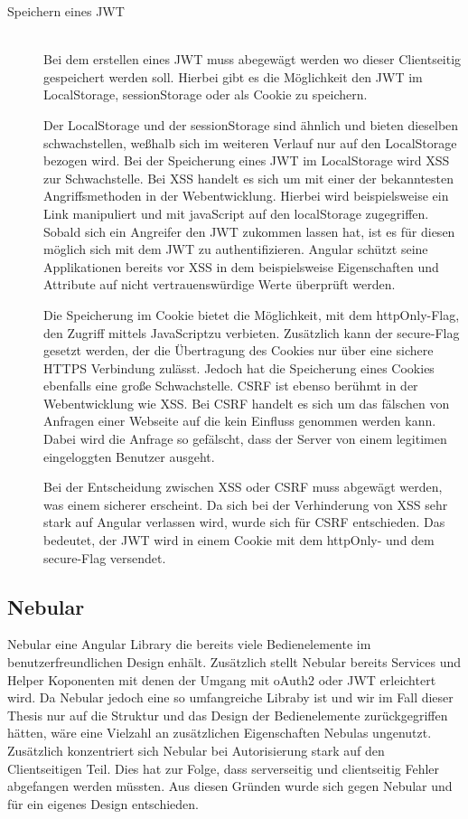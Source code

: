 \documentclass[paper=a4,fontsize=12pt,parskip=half]{scrartcl}
\newcommand{\JS}{JavaScript}
\begin{document}
	\begin{description}
		\item[Speichern eines \gls{JWT}]\hfill\\
		Bei dem erstellen eines \gls{JWT} muss abegewägt werden wo dieser Clientseitig gespeichert werden soll. Hierbei gibt es die Möglichkeit den \gls{JWT} im LocalStorage, sessionStorage oder als Cookie zu speichern.
		
		Der LocalStorage und der sessionStorage sind ähnlich und bieten dieselben schwachstellen, weßhalb sich im weiteren Verlauf nur auf den LocalStorage bezogen wird. Bei der Speicherung eines \gls{JWT} im LocalStorage wird \gls{XSS} zur Schwachstelle. Bei \gls{XSS} handelt es sich um mit einer der bekanntesten Angriffsmethoden in der Webentwicklung. Hierbei wird beispielsweise ein Link manipuliert und mit javaScript auf den localStorage zugegriffen. Sobald sich ein Angreifer den \gls{JWT} zukommen lassen hat, ist es für diesen möglich sich mit dem \gls{JWT} zu authentifizieren. Angular schützt seine Applikationen bereits vor \gls{XSS} in dem beispielsweise Eigenschaften und Attribute auf nicht vertrauenswürdige Werte überprüft werden.
		
		Die Speicherung im Cookie bietet die Möglichkeit, mit dem httpOnly-Flag, den Zugriff mittels \JS  zu verbieten. Zusätzlich kann der secure-Flag gesetzt werden, der die Übertragung des Cookies nur über eine sichere \gls{HTTPS} Verbindung zulässt. Jedoch hat die Speicherung eines Cookies ebenfalls eine große Schwachstelle. \gls{CSRF} ist ebenso berühmt in der Webentwicklung wie \gls{XSS}. Bei \gls{CSRF} handelt es sich um das fälschen von Anfragen einer Webseite auf die kein Einfluss genommen werden kann. Dabei wird die Anfrage so gefälscht, dass der Server von einem legitimen eingeloggten Benutzer ausgeht.
		
		Bei der Entscheidung zwischen \gls{XSS} oder \gls{CSRF} muss abgewägt werden, was einem sicherer erscheint. Da sich bei der Verhinderung von \gls{XSS} sehr stark auf Angular verlassen wird, wurde sich für \gls{CSRF} entschieden. Das bedeutet, der \gls{JWT} wird in einem Cookie mit dem httpOnly- und dem secure-Flag versendet.
	\end{description}
	
	\subsection{Nebular}
	\label{sec: nebular}
	Nebular eine Angular Library die bereits viele Bedienelemente im benutzerfreundlichen Design enhält. Zusätzlich stellt Nebular bereits Services und Helper Koponenten mit denen der Umgang mit \gls{oAuth2} oder \gls{JWT} erleichtert wird. Da Nebular jedoch eine so umfangreiche Libraby ist und wir im Fall dieser Thesis nur auf die Struktur und das Design der Bedienelemente zurückgegriffen hätten, wäre eine Vielzahl an zusätzlichen Eigenschaften Nebulas ungenutzt. Zusätzlich konzentriert sich Nebular bei Autorisierung stark auf den Clientseitigen Teil. Dies hat zur Folge, dass serverseitig und clientseitig Fehler abgefangen werden müssten. Aus diesen Gründen wurde sich gegen Nebular und für ein eigenes Design entschieden.
	
\end{document}
